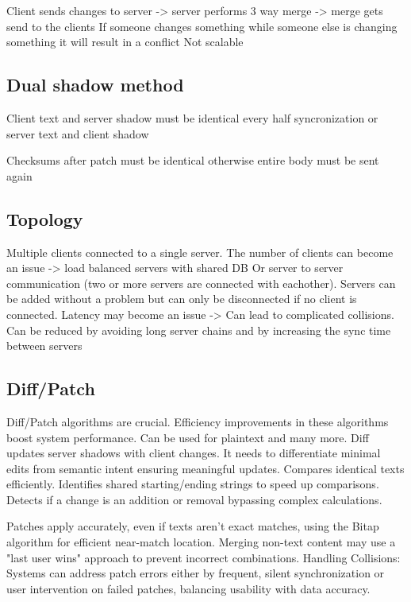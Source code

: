 Client sends changes to server -> server performs 3 way merge -> merge gets send to the clients
If someone changes something while someone else is changing something it will result in a conflict
Not scalable

\subsection{Dual shadow method}

Client text and server shadow must be identical every half syncronization or server text and client shadow

Checksums after patch must be identical otherwise entire body must be sent again

\subsection{Topology}

Multiple clients connected to a single server.
The number of clients can become an issue -> load balanced servers with shared DB
Or server to server communication (two or more servers are connected with eachother). Servers can be added without a problem but can only be disconnected if no client is connected.
Latency may become an issue -> Can lead to complicated collisions. 
Can be reduced by avoiding long server chains and by increasing the sync time between servers

\subsection{Diff/Patch}
Diff/Patch algorithms are crucial. Efficiency improvements in these algorithms boost system performance. Can be used for plaintext and many more. Diff updates server shadows with client changes. It needs to differentiate minimal edits from semantic intent ensuring meaningful updates. Compares identical texts efficiently. Identifies shared starting/ending strings to speed up comparisons. Detects if a change is an addition or removal bypassing complex calculations.


Patches apply accurately, even if texts aren’t exact matches, using the Bitap algorithm for efficient near-match location. Merging non-text content may use a "last user wins" approach to prevent incorrect combinations.
Handling Collisions: Systems can address patch errors either by frequent, silent synchronization or user intervention on failed patches, balancing usability with data accuracy.

